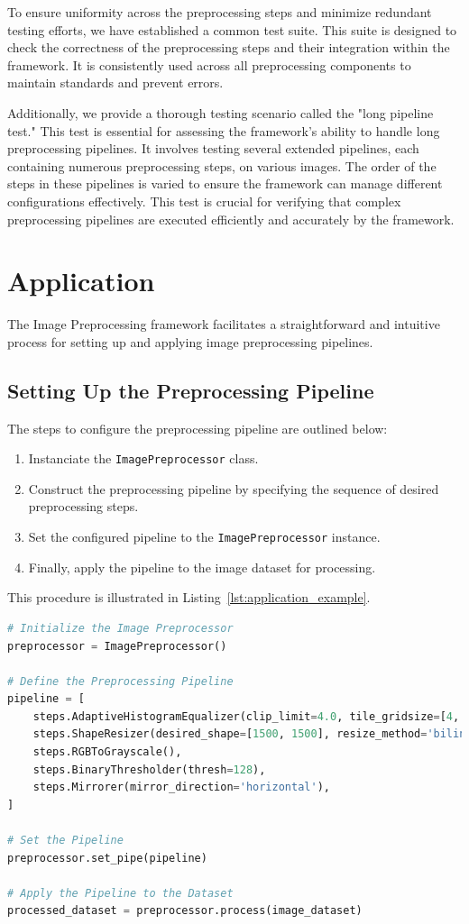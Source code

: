 \documentclass[journal]{new-aiaa}
\begin{document}
To ensure uniformity across the preprocessing steps and minimize redundant testing efforts, we have established a common test suite. This suite is designed to check the correctness of the preprocessing steps and their integration within the framework. It is consistently used across all preprocessing components to maintain standards and prevent errors.

Additionally, we provide a thorough testing scenario called the "long pipeline test." This test is essential for assessing the framework’s ability to handle long preprocessing pipelines. It involves testing several extended pipelines, each containing numerous preprocessing steps, on various images. The order of the steps in these pipelines is varied to ensure the framework can manage different configurations effectively. This test is crucial for verifying that complex preprocessing pipelines are executed efficiently and accurately by the framework.


\section{Application}
The Image Preprocessing framework facilitates a straightforward and intuitive process for setting up and applying image preprocessing pipelines.

\subsection{Setting Up the Preprocessing Pipeline}
The steps to configure the preprocessing pipeline are outlined below:

\begin{enumerate}
	\item Instanciate the \texttt{ImagePreprocessor} class.
	\item Construct the preprocessing pipeline by specifying the sequence of desired preprocessing steps.
	\item Set the configured pipeline to the \texttt{ImagePreprocessor} instance.
	\item Finally, apply the pipeline to the image dataset for processing.
\end{enumerate}
This procedure is illustrated in Listing~\ref{lst:application_example}.
\begin{lstlisting}[language=Python, caption=Example of Applying the Image Preprocessing Pipeline, label=lst:application_example]
# Initialize the Image Preprocessor
preprocessor = ImagePreprocessor()

# Define the Preprocessing Pipeline
pipeline = [
    steps.AdaptiveHistogramEqualizer(clip_limit=4.0, tile_gridsize=[4, 4]),
    steps.ShapeResizer(desired_shape=[1500, 1500], resize_method='bilinear'),
    steps.RGBToGrayscale(),
    steps.BinaryThresholder(thresh=128),
    steps.Mirrorer(mirror_direction='horizontal'),
]

# Set the Pipeline 
preprocessor.set_pipe(pipeline)

# Apply the Pipeline to the Dataset
processed_dataset = preprocessor.process(image_dataset)
\end{lstlisting}
\end{document}
